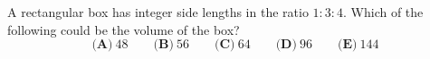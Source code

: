 A rectangular box has integer side lengths in the ratio $1:3:4$. Which of the following could be the volume of the box?
\[\textbf{(A)}\ 48\qquad\textbf{(B)}\ 56\qquad\textbf{(C)}\ 64\qquad\textbf{(D)}\ 96\qquad\textbf{(E)}\ 144\]

